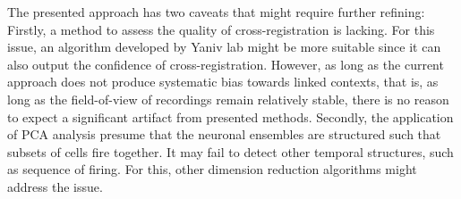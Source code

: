 \documentclass[master.tex]{subfiles}
\begin{document}
The presented approach has two caveats that might require further refining:
Firstly, a method to assess the quality of cross-registration is lacking. For
this issue, an algorithm developed by Yaniv lab might be more suitable since it
can also output the confidence of cross-registration. However, as long as the
current approach does not produce systematic bias towards linked contexts, that
is, as long as the field-of-view of recordings remain relatively stable, there
is no reason to expect a significant artifact from presented methods. Secondly,
the application of PCA analysis presume that the neuronal ensembles are
structured such that subsets of cells fire together. It may fail to detect other
temporal structures, such as sequence of firing. For this, other dimension
reduction algorithms might address the issue.
\end{document}
